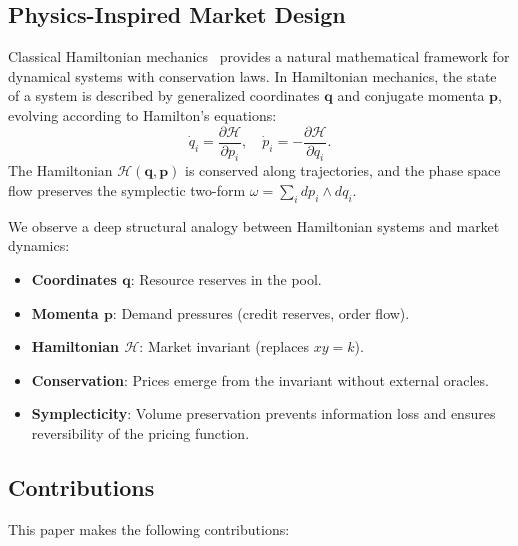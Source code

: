\subsection{Physics-Inspired Market Design}

Classical Hamiltonian mechanics~\cite{arnold1989mathematical,goldstein2002classical} provides a natural mathematical framework for dynamical systems with conservation laws. In Hamiltonian mechanics, the state of a system is described by generalized coordinates $\bm{q}$ and conjugate momenta $\bm{p}$, evolving according to Hamilton's equations:
\begin{equation}
\dot{q}_i = \frac{\partial \mathcal{H}}{\partial p_i}, \quad \dot{p}_i = -\frac{\partial \mathcal{H}}{\partial q_i}.
\label{eq:hamilton}
\end{equation}
The Hamiltonian $\mathcal{H}(\bm{q}, \bm{p})$ is conserved along trajectories, and the phase space flow preserves the symplectic two-form $\omega = \sum_i dp_i \wedge dq_i$.

We observe a deep structural analogy between Hamiltonian systems and market dynamics:
\begin{itemize}[leftmargin=1.1em]
    \item \textbf{Coordinates $\bm{q}$}: Resource reserves in the pool.
    \item \textbf{Momenta $\bm{p}$}: Demand pressures (credit reserves, order flow).
    \item \textbf{Hamiltonian $\mathcal{H}$}: Market invariant (replaces $xy = k$).
    \item \textbf{Conservation}: Prices emerge from the invariant without external oracles.
    \item \textbf{Symplecticity}: Volume preservation prevents information loss and ensures reversibility of the pricing function.
\end{itemize}

\subsection{Contributions}

This paper makes the following contributions:

